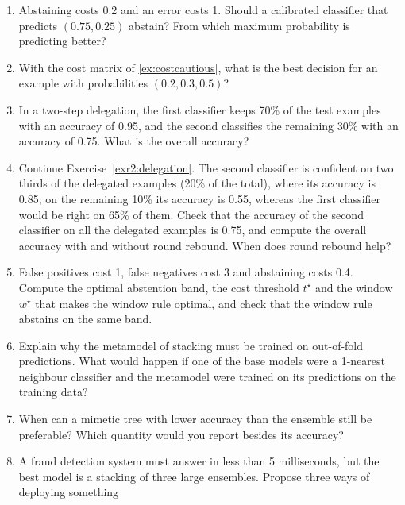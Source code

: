 \begin{enumerate}[label=\textbf{2.\arabic*},ref=2.\arabic*,leftmargin=*,itemsep=6pt]
        $w=0.5$ to the probability vectors $(0.9,0.1)$, $(0.7,0.3)$, $(0.55,0.45)$ and $(0.2,0.8)$.
  \item\label{exr2:chow} Abstaining costs 0.2 and an error costs 1. Should a calibrated classifier
        that predicts $(0.75,0.25)$ abstain? From which maximum probability is predicting better?
  \item\label{exr2:costcautious} With the cost matrix of \cref{ex:costcautious}, what is the best
        decision for an example with probabilities $(0.2,0.3,0.5)$?
  \item\label{exr2:delegation} In a two-step delegation, the first classifier keeps 70\% of the
        test examples with an accuracy of 0.95, and the second classifies the remaining 30\% with an
        accuracy of 0.75. What is the overall accuracy?
  \item\label{exr2:rebound} Continue Exercise~\ref{exr2:delegation}. The second classifier is
        confident on two thirds of the delegated examples (20\% of the total), where its accuracy
        is 0.85; on the remaining 10\% its accuracy is 0.55, whereas the first classifier would be
        right on 65\% of them. Check that the accuracy of the second classifier on all the
        delegated examples is 0.75, and compute the overall accuracy with and without round
        rebound. When does round rebound help?
  \item\label{exr2:window} False positives cost 1, false negatives cost 3 and abstaining costs
        0.4. Compute the optimal abstention band, the cost threshold $t^\star$ and the window
        $w^\star$ that makes the window rule optimal, and check that the window rule abstains on
        the same band.
  \item\label{exr2:stacking} Explain why the metamodel of stacking must be trained on out-of-fold
        predictions. What would happen if one of the base models were a 1-nearest neighbour
        classifier and the metamodel were trained on its predictions on the training data?
  \item\label{exr2:mimetic} When can a mimetic tree with lower accuracy than the ensemble still be
        preferable? Which quantity would you report besides its accuracy?
  \item\label{exr2:design} A fraud detection system must answer in less than 5 milliseconds, but the
        best model is a stacking of three large ensembles. Propose three ways of deploying something

\end{enumerate}
